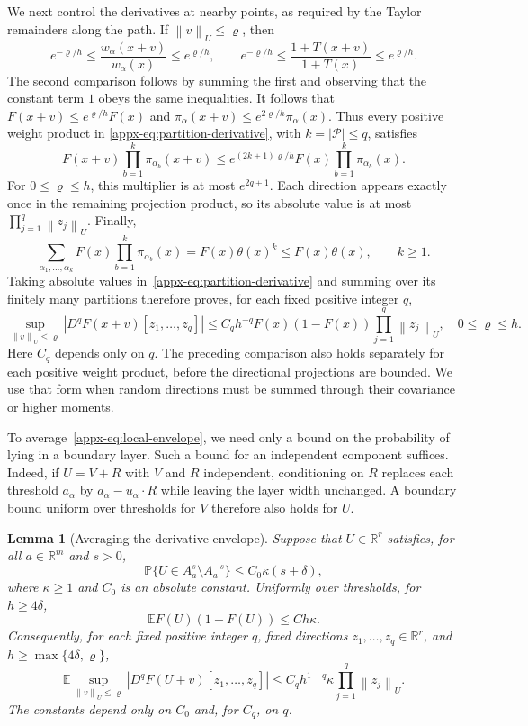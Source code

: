 \documentclass[11pt,letterpaper,twoside,leqno]{article}
\theoremstyle{bookplain}
\newtheorem{lemma}{Lemma}
\theoremstyle{bookremark}
\newcommand{\E}{\mathbb E}
\newcommand{\Pp}{\mathbb P}
\newcommand{\R}{\mathbb R}
\newcommand{\norm}[1]{\left\lVert#1\right\rVert}
\begin{document}
We next control the derivatives at nearby points, as required by
the Taylor remainders along the path. If $\norm v_U\le\varrho$, then
\[
 e^{-\varrho/h}\le
 \frac{w_\alpha(x+v)}{w_\alpha(x)}
 \le e^{\varrho/h},
 \qquad
 e^{-\varrho/h}\le
 \frac{1+T(x+v)}{1+T(x)}
 \le e^{\varrho/h}.
\]
The second comparison follows by summing the first and observing
that the constant term $1$ obeys the same inequalities.
It follows that $F(x+v)\le e^{\varrho/h}F(x)$ and
$\pi_\alpha(x+v)\le e^{2\varrho/h}\pi_\alpha(x)$.
Thus every positive weight product in
\eqref{appx-eq:partition-derivative}, with $k=|\mathcal P|\le q$,
satisfies
\[
 F(x+v)\prod_{b=1}^k\pi_{\alpha_b}(x+v)
 \le e^{(2k+1)\varrho/h}
        F(x)\prod_{b=1}^k\pi_{\alpha_b}(x).
\]
For $0\le\varrho\le h$, this multiplier is at most $e^{2q+1}$.
Each direction appears exactly once in the remaining projection
product, so its absolute value is at most
$\prod_{j=1}^q\norm{z_j}_U$. Finally,
\[
 \sum_{\alpha_1,\ldots,\alpha_k}
     F(x)\prod_{b=1}^k\pi_{\alpha_b}(x)
 =F(x)\theta(x)^k\le F(x)\theta(x),
 \qquad k\ge1.
\]
Taking absolute values in~\eqref{appx-eq:partition-derivative}
and summing over its finitely many partitions therefore proves,
for each fixed positive integer $q$,
\begin{equation}
 \sup_{\norm v_U\le\varrho}|D^qF(x+v)[z_1,\ldots,z_q]|
 \le C_qh^{-q}F(x)(1-F(x))\prod_{j=1}^q\norm{z_j}_U,
 \quad 0\le\varrho\le h.
 \label{appx-eq:local-envelope}
\end{equation}
Here $C_q$ depends only on $q$. The preceding comparison also holds
separately for each positive weight product, before the directional
projections are bounded. We use that form when random directions
must be summed through their covariance or higher moments.

To average~\eqref{appx-eq:local-envelope}, we need only a bound on
the probability of lying in a boundary layer. Such a bound for an
independent component suffices. Indeed, if $U=V+R$ with $V$ and $R$
independent, conditioning on $R$ replaces each threshold $a_\alpha$
by $a_\alpha-u_\alpha\cdot R$ while leaving the layer width unchanged.
A boundary bound uniform over thresholds for $V$ therefore also
holds for $U$.

\begin{lemma}[Averaging the derivative envelope]\label{appx-lem:envelope}
Suppose that $U\in\R^r$ satisfies, for all $a\in\R^m$ and $s>0$,
\[
 \Pp\{U\in A_a^s\setminus A_a^{-s}\}
 \le C_0\kappa(s+\delta),
\]
where $\kappa\ge1$ and $C_0$ is an absolute constant.
Uniformly over thresholds, for $h\ge4\delta$,
\begin{equation}
 \E F(U)(1-F(U))\le Ch\kappa.
 \label{appx-eq:small-envelope}
\end{equation}
Consequently, for each fixed positive integer $q$, fixed directions
$z_1,\ldots,z_q\in\R^r$, and $h\ge\max\{4\delta,\varrho\}$,
\begin{equation}
 \E\sup_{\norm v_U\le\varrho}|D^qF(U+v)[z_1,\ldots,z_q]|
 \le C_qh^{1-q}\kappa\prod_{j=1}^q\norm{z_j}_U.
 \label{appx-eq:averaged-derivatives}
\end{equation}
The constants depend only on $C_0$ and, for $C_q$, on $q$.
\end{lemma}
\end{document}
